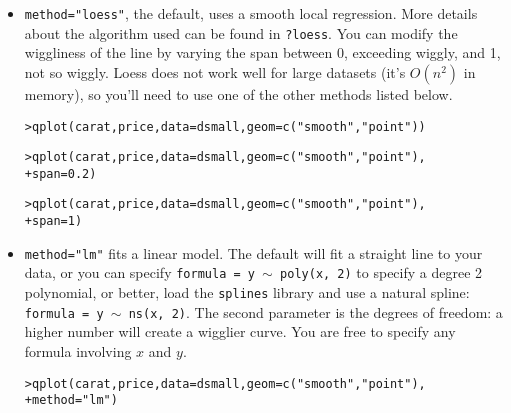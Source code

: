 \begin{itemize}
	\item {\tt method="loess"}, the default, uses a smooth local regression.  More details about the algorithm used can be found in {\tt ?loess}.  You can modify the wiggliness of the line by varying the span between 0, exceeding wiggly, and 1, not so wiggly.  Loess does not work well for large datasets (it's $O(n^2)$ in memory), so you'll need to use one of the other methods listed below.

\begin{alltt}
> qplot(carat, price, data = dsmall, geom = c("smooth", "point"))
\end{alltt}
\begin{alltt}

> qplot(carat, price, data = dsmall, geom = c("smooth", "point"), 
+     span = 0.2)
\end{alltt}
\begin{alltt}

> qplot(carat, price, data = dsmall, geom = c("smooth", "point"), 
+     span = 1)
\end{alltt}
\begin{alltt}

\end{alltt}

	\item {\tt method="lm"} fits a linear model.  The default will fit a straight line to your data, or you can specify {\tt formula = y $\sim$ poly(x, 2)} to specify a degree 2 polynomial, or better, load the {\tt splines} library and use a natural spline: {\tt formula = y $\sim$ ns(x, 2)}. The second parameter is the degrees of freedom: a higher number will create a wigglier curve. You are free to specify any formula involving $x$ and $y$.  

\begin{alltt}
> qplot(carat, price, data = dsmall, geom = c("smooth", "point"), 
+     method = "lm")
\end{alltt}
\begin{alltt}


\end{alltt}
\end{itemize}
